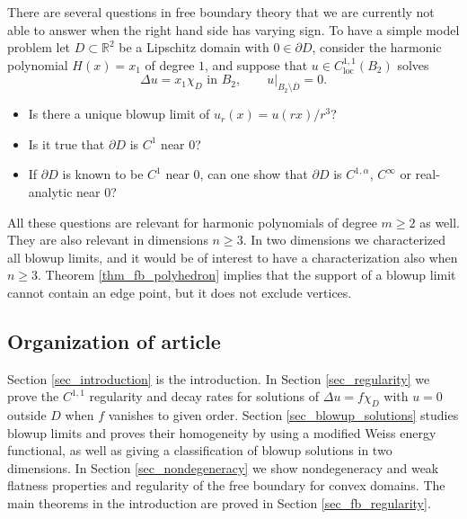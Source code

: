 \documentclass[11pt,a4paper]{amsart}
\theoremstyle{definition}
\numberwithin{equation}{section}
\newcommand{\mR}{\mathbb{R}}                    %
\newcommand{\ol}[1]{\overline{#1}}
\newcommand{\p}{\partial}
\begin{document}
There are several questions in free boundary theory that we are currently not able to answer when the right hand side has varying sign. To have a simple model problem let $D \subset \mR^2$ be a Lipschitz domain with $0 \in \p D$, consider the harmonic polynomial $H(x) = x_1$ of degree $1$, and suppose that $u \in C^{1,1}_{\mathrm{loc}}(B_2)$ solves 
\[
\Delta u = x_1 \chi_D \text{ in $B_2$}, \qquad u|_{B_2 \setminus \ol{D}} = 0.
\]
\begin{itemize}
\item 
Is there a unique blowup limit of $u_r(x) = u(rx)/r^3$?
\item 
Is it true that $\p D$ is $C^1$ near $0$?
\item 
If $\p D$ is known to be $C^1$ near $0$, can one show that $\p D$ is $C^{1,\alpha}$,  $C^{\infty}$ or  real-analytic near $0$?
\end{itemize}





All these questions are relevant for harmonic polynomials of degree $m \geq 2$ as well. They are also relevant in dimensions $n \geq 3$. In two dimensions we  characterized all blowup limits, and it would be of interest to have a characterization also when $n \geq 3$. Theorem \ref{thm_fb_polyhedron} implies that the support of a blowup limit cannot contain an edge point, but it does not exclude vertices. 




\subsection*{Organization of article}

Section \ref{sec_introduction} is the introduction. In Section \ref{sec_regularity} we prove the $C^{1,1}$ regularity and decay rates for solutions of $\Delta u = f \chi_D$ with $u = 0$ outside $D$ when $f$ vanishes to given order. Section \ref{sec_blowup_solutions} studies blowup limits and proves their homogeneity by using a modified Weiss energy functional, as well as giving a classification of blowup solutions in two dimensions. In Section \ref{sec_nondegeneracy} we show nondegeneracy and weak flatness properties and regularity of the free boundary for convex domains. The main theorems in the introduction are proved in Section \ref{sec_fb_regularity}.
\end{document}
